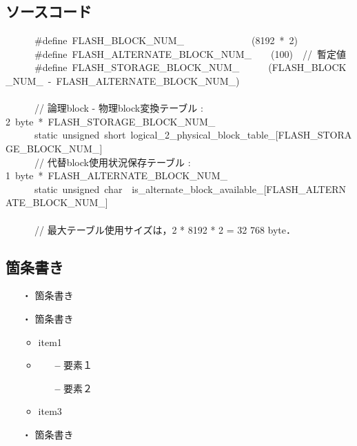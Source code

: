 \documentclass[10pt,a4paper]{ltjsarticle}           %
\newcommand{\mySubsection}[1] {
    \subsection{#1}
    \vspace{-5pt}
}
\begin{document}
\mySubsection{ソースコード}
\begin{spacing}{0.8}
\begin{footnotesize}
\begin{ttfamily}
\begin{fontConsolas}
\noindent
~~~~~~\#define~FLASH\_BLOCK\_NUM\_~~~~~~~~~~~~~~(8192~*~2)\\
~~~~~~\#define~FLASH\_ALTERNATE\_BLOCK\_NUM\_~~~~(100)~~//~暫定値\\
~~~~~~\#define~FLASH\_STORAGE\_BLOCK\_NUM\_~~~~~~(FLASH\_BLOCK\_NUM\_~-~FLASH\_ALTERNATE\_BLOCK\_NUM\_)\\
~~~~~~\\
~~~~~~// 論理block - 物理block変換テーブル : 2~byte~*~FLASH\_STORAGE\_BLOCK\_NUM\_\\
~~~~~~static~unsigned~short~logical\_2\_physical\_block\_table\_[FLASH\_STORAGE\_BLOCK\_NUM\_]\\
~~~~~~// 代替block使用状況保存テーブル : 1~byte~*~FLASH\_ALTERNATE\_BLOCK\_NUM\_\\
~~~~~~static~unsigned~char~~is\_alternate\_block\_available\_[FLASH\_ALTERNATE\_BLOCK\_NUM\_]\\
~~~~~~\\
~~~~~~// 最大テーブル使用サイズは，2 * 8192 * 2 = 32 768 byte．
\end{fontConsolas}
\end{ttfamily}
\end{footnotesize}
\end{spacing}

\mySubsection{箇条書き}
\begin{itemize}
    \setlength{\leftskip}{-15pt}
    \item[・] 箇条書き
    \item[・] 箇条書き
    \begin{itemize}
        \setlength{\leftskip}{-10pt}
        \item item1
        \item {}
        \begin{itemize}
            \setlength{\leftskip}{-5pt}
            \item[{\normalfont\bfseries --}] 要素１
            \item[{\normalfont\bfseries --}] 要素２
        \end{itemize}
        \item item3
    \end{itemize}
    \item[・] 箇条書き
\end{itemize}
\end{document}
